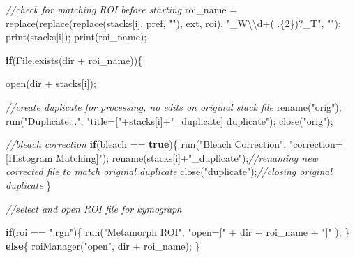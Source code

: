 \documentclass[
  12pt,
  a4paper,
]{book}
\newenvironment{Shaded}{}{}
\newcommand{\CommentTok}[1]{\textcolor[rgb]{0.38,0.63,0.69}{\textit{#1}}}
\newcommand{\ControlFlowTok}[1]{\textcolor[rgb]{0.00,0.44,0.13}{\textbf{#1}}}
\newcommand{\KeywordTok}[1]{\textcolor[rgb]{0.00,0.44,0.13}{\textbf{#1}}}
\newcommand{\NormalTok}[1]{#1}
\newcommand{\OperatorTok}[1]{\textcolor[rgb]{0.40,0.40,0.40}{#1}}
\newcommand{\SpecialCharTok}[1]{\textcolor[rgb]{0.25,0.44,0.63}{#1}}
\newcommand{\StringTok}[1]{\textcolor[rgb]{0.25,0.44,0.63}{#1}}
\begin{document}
\begin{Shaded}
\begin{Highlighting}[]
    \CommentTok{//check for matching ROI before starting}
\NormalTok{    roi\_name }\OperatorTok{=}\NormalTok{ replace}\OperatorTok{(}\NormalTok{replace}\OperatorTok{(}\NormalTok{replace}\OperatorTok{(}\NormalTok{stacks}\OperatorTok{[}\NormalTok{i}\OperatorTok{],}\NormalTok{ pref}\OperatorTok{,} \StringTok{""}\OperatorTok{),}\NormalTok{ ext}\OperatorTok{,}\NormalTok{ roi}\OperatorTok{),} \StringTok{"\_W}\SpecialCharTok{\textbackslash{}\textbackslash{}}\StringTok{d+( .}\SpecialCharTok{\{2\}}\StringTok{)?\_T"}\OperatorTok{,} \StringTok{""}\OperatorTok{);}
\NormalTok{    print}\OperatorTok{(}\NormalTok{stacks}\OperatorTok{[}\NormalTok{i}\OperatorTok{]);}
\NormalTok{    print}\OperatorTok{(}\NormalTok{roi\_name}\OperatorTok{);}

    \ControlFlowTok{if}\OperatorTok{(}\NormalTok{File}\OperatorTok{.}\NormalTok{exists}\OperatorTok{(}\NormalTok{dir }\OperatorTok{+}\NormalTok{ roi\_name}\OperatorTok{))\{}
        
\NormalTok{        open}\OperatorTok{(}\NormalTok{dir }\OperatorTok{+}\NormalTok{ stacks}\OperatorTok{[}\NormalTok{i}\OperatorTok{]);}
        
        \CommentTok{//create duplicate for processing, no edits on original stack file}
\NormalTok{        rename}\OperatorTok{(}\StringTok{"orig"}\OperatorTok{);}
\NormalTok{        run}\OperatorTok{(}\StringTok{"Duplicate..."}\OperatorTok{,} \StringTok{"title=["}\OperatorTok{+}\NormalTok{stacks}\OperatorTok{[}\NormalTok{i}\OperatorTok{]+}\StringTok{"\_duplicate] duplicate"}\OperatorTok{);}
\NormalTok{        close}\OperatorTok{(}\StringTok{"orig"}\OperatorTok{);}
    
        \CommentTok{//bleach correction}
        \ControlFlowTok{if}\OperatorTok{(}\NormalTok{bleach }\OperatorTok{==} \KeywordTok{true}\OperatorTok{)\{}
\NormalTok{            run}\OperatorTok{(}\StringTok{"Bleach Correction"}\OperatorTok{,} \StringTok{"correction=[Histogram Matching]"}\OperatorTok{);}
\NormalTok{            rename}\OperatorTok{(}\NormalTok{stacks}\OperatorTok{[}\NormalTok{i}\OperatorTok{]+}\StringTok{"\_duplicate"}\OperatorTok{);}\CommentTok{//renaming new corrected file to match \textquotesingle{}original\textquotesingle{} duplicate}
\NormalTok{            close}\OperatorTok{(}\StringTok{"duplicate"}\OperatorTok{);}\CommentTok{//closing \textquotesingle{}original\textquotesingle{} duplicate}
        \OperatorTok{\}}
    
        \CommentTok{//select and open ROI file for kymograph}
        
        \ControlFlowTok{if}\OperatorTok{(}\NormalTok{roi }\OperatorTok{==} \StringTok{".rgn"}\OperatorTok{)\{}
\NormalTok{            run}\OperatorTok{(}\StringTok{"Metamorph ROI"}\OperatorTok{,} \StringTok{"open=["} \OperatorTok{+}\NormalTok{ dir }\OperatorTok{+}\NormalTok{ roi\_name }\OperatorTok{+} \StringTok{"]"} \OperatorTok{);}
        \OperatorTok{\}}
        \ControlFlowTok{else}\OperatorTok{\{}
\NormalTok{            roiManager}\OperatorTok{(}\StringTok{"open"}\OperatorTok{,}\NormalTok{ dir }\OperatorTok{+}\NormalTok{ roi\_name}\OperatorTok{);}
        \OperatorTok{\}}
            

\end{Highlighting}
\end{Shaded}
\end{document}
